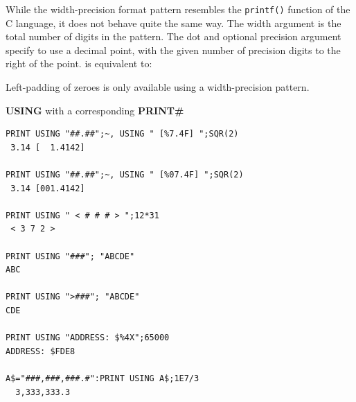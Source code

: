 \begin{description}[leftmargin=2cm,style=nextline]
                  While the width-precision format pattern resembles the \texttt{printf()} function of the C language, it does not behave quite the same way. The width argument is the total number of digits in the pattern. The dot and optional precision argument specify to use a decimal point, with the given number of precision digits to the right of the point.  is equivalent to: 

                  Left-padding of zeroes is only available using a width-precision pattern.

\item [Examples:] {\bf USING} with a corresponding {\bf PRINT\#}

\begin{tcolorbox}[colback=black,coltext=white]
\verbatimfont{\codefont}
\begin{verbatim}
PRINT USING "##.##";~, USING " [%7.4F] ";SQR(2)
 3.14 [  1.4142]

PRINT USING "##.##";~, USING " [%07.4F] ";SQR(2)
 3.14 [001.4142]

PRINT USING " < # # # > ";12*31
 < 3 7 2 >

PRINT USING "###"; "ABCDE"
ABC

PRINT USING ">###"; "ABCDE"
CDE

PRINT USING "ADDRESS: $%4X";65000
ADDRESS: $FDE8

A$="###,###,###.#":PRINT USING A$;1E7/3
  3,333,333.3
\end{verbatim}
\end{tcolorbox}
\end{description}


\newpage
